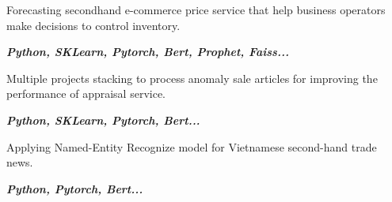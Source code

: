 \documentclass[10pt,a4paper,ragged2e,withhyper]{altacv}
\begin{document}
\begin{paracol}{2}
\medskip
{}
\begin{minipage}{\linewidth}
\end{minipage}

\medskip
{}
\begin{minipage}{\linewidth}
\end{minipage}
\end{paracol}

\break
{}
\begin{minipage}{\linewidth}
	\justifying
	Forecasting secondhand e-commerce price service that help business operators make decisions to control inventory.
	
	\textit{\textbf{Python, SKLearn, Pytorch, Bert, Prophet, Faiss...}}
	
\end{minipage}

\medskip

\divider

\begin{minipage}{\linewidth}
	\justifying
	Multiple projects stacking to process anomaly sale articles for improving the performance of appraisal service.
	
	\textit{\textbf{Python, SKLearn, Pytorch, Bert...}}
	
\end{minipage}

\medskip

\divider

\begin{minipage}{\linewidth}
	\justifying
	Applying Named-Entity Recognize model for Vietnamese second-hand trade news.
	
	\textit{\textbf{Python, Pytorch, Bert...}}
	
\end{minipage}
\end{document}
